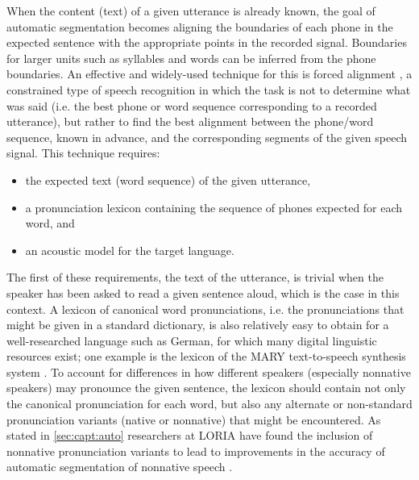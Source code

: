 	When the content (text) of a given utterance is already known, the goal of automatic segmentation becomes aligning the  boundaries of each phone in the expected sentence with the appropriate points in the recorded signal. Boundaries for larger units such as syllables and words can be inferred from the phone boundaries. 
	An effective and widely-used technique for this is 
	forced
	alignment \citep{Fohr1996,Mesbahi2011,Fohr2012,Fauth2014},
	a constrained type of speech recognition in which the task is not to determine what was said (i.e. the best phone or word sequence corresponding to a recorded utterance),  but rather to find the best alignment between the phone/word sequence, known in advance, and the corresponding segments of the given speech signal.
	This technique	requires:
	\begin{itemize}[topsep=-1em]
	\item the expected text (word sequence) of the given utterance, 
	\item a pronunciation lexicon containing the sequence of phones expected for each word, and
	\item an acoustic model for the target language.
	\end{itemize}
	
	The first of these requirements, the text of the utterance, is trivial when the speaker has been asked to read a given sentence aloud, which is the case in this context.
	A lexicon of canonical word pronunciations, i.e. the pronunciations that might be given in a standard dictionary, is also relatively easy to obtain for a well-researched language such as German, for which many digital linguistic resources exist; one example is the lexicon of the MARY text-to-speech synthesis system \citep{Schroeder2003}.
	 To account for differences in how different speakers (especially nonnative speakers) may pronounce the given sentence, 
	the lexicon should contain not only the canonical pronunciation for each word, but also any alternate or non-standard pronunciation variants (native or nonnative) that might be encountered. As stated in \cref{sec:capt:auto} researchers at LORIA have found the inclusion of nonnative pronunciation variants to lead to improvements in the accuracy of automatic segmentation of nonnative speech \citep{Jouvet2011,Mesbahi2011,Bonneau2012,Orosanu2012}.
	
